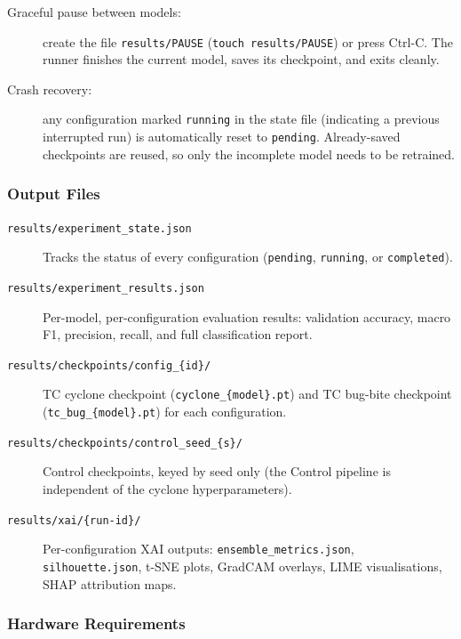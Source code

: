 \documentclass[12pt,a4paper]{article}
\begin{document}
\begin{description}
    \item[Graceful pause between models:] create the file
          \texttt{results/PAUSE} (\texttt{touch results/PAUSE}) or press
          Ctrl-C. The runner finishes the current model, saves its checkpoint,
          and exits cleanly.
    \item[Crash recovery:] any configuration marked \texttt{running} in the
          state file (indicating a previous interrupted run) is automatically
          reset to \texttt{pending}. Already-saved checkpoints are reused,
          so only the incomplete model needs to be retrained.
\end{description}

\subsubsection{Output Files}

\begin{description}
    \item[\texttt{results/experiment\_state.json}]
          Tracks the status of every configuration (\texttt{pending},
          \texttt{running}, or \texttt{completed}).
    \item[\texttt{results/experiment\_results.json}]
          Per-model, per-configuration evaluation results: validation accuracy,
          macro F1, precision, recall, and full classification report.
    \item[\texttt{results/checkpoints/config\_\{id\}/}]
          TC cyclone checkpoint (\texttt{cyclone\_\{model\}.pt}) and
          TC bug-bite checkpoint (\texttt{tc\_bug\_\{model\}.pt}) for each
          configuration.
    \item[\texttt{results/checkpoints/control\_seed\_\{s\}/}]
          Control checkpoints, keyed by seed only (the Control pipeline is
          independent of the cyclone hyperparameters).
    \item[\texttt{results/xai/\{run-id\}/}]
          Per-configuration XAI outputs: \texttt{ensemble\_metrics.json},
          \\\texttt{silhouette.json}, t-SNE plots, GradCAM overlays,
          LIME visualisations, SHAP attribution maps.
\end{description}

\subsubsection{Hardware Requirements}
\end{document}
